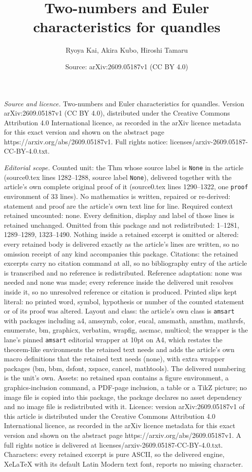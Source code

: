\documentclass[10pt,a4paper]{amsart}
\title[Two-numbers and Euler characteristics for quandles]{Two-numbers and Euler characteristics for quandles}
\author{Ryoya Kai, Akira Kubo, Hiroshi Tamaru}
\date{Source: arXiv:2609.05187v1 (CC BY 4.0)}
\begin{document}
\maketitle

\noindent\emph{Source and licence.} Two-numbers and Euler characteristics for quandles. Version arXiv:2609.05187v1 (CC BY 4.0), distributed under the Creative Commons Attribution 4.0 International licence, as recorded in the arXiv licence metadata for this exact version and shown on the abstract page https://arxiv.org/abs/2609.05187v1. Full rights notice: licenses/arxiv-2609.05187-CC-BY-4.0.txt.\par\smallskip

\noindent\textit{Editorial scope.} Counted unit: the Thm whose source label is \texttt{None} in the article (source0.tex lines 1282--1288, source label \texttt{None}), delivered together with the article's own complete original proof of it (source0.tex lines 1290--1322, one \texttt{proof} environment of 33 lines). No mathematics is written, repaired or re-derived: statement and proof are the article's own text line for line. Required context retained uncounted: none. Every definition, display and label of those lines is retained unchanged. Omitted from this package and not redistributed: 1--1281, 1289--1289, 1323--1490. Nothing inside a retained excerpt is omitted or altered: every retained body is delivered exactly as the article's lines are written, so no omission receipt of any kind accompanies this package. Citations: the retained excerpts carry no citation command at all, so no bibliography entry of the article is transcribed and no reference is redistributed. Reference adaptation: none was needed and none was made; every reference inside the delivered unit resolves inside it, so no unresolved reference or citation is produced. Printed slips kept literal: no printed word, symbol, hypothesis or number of the counted statement or of its proof was altered. Layout and class: the article's own class is \texttt{amsart} with packages including a4, amssymb, color, eucal, amsmath, amsthm, mathrsfs, enumerate, bm, graphicx, verbatim, wrapfig, ascmac, multicol; the wrapper is the lane's pinned \texttt{amsart} editorial wrapper at 10pt on A4, which restates the theorem-like environments the retained text needs and adds the article's own macro definitions that the retained text needs (none), with extra wrapper packages (bm, bbm, dsfont, xspace, cancel, mathtools). The delivered numbering is the unit's own. Assets: no retained span contains a figure environment, a graphics-inclusion command, a PDF-page inclusion, a table or a TikZ picture; no image file is copied into this package, the package declares no asset dependency and no image file is redistributed with it. Licence: version arXiv:2609.05187v1 of this article is distributed under the Creative Commons Attribution 4.0 International licence, as recorded in the arXiv licence metadata for this exact version and shown on the abstract page https://arxiv.org/abs/2609.05187v1. A full rights notice is delivered at licenses/arxiv-2609.05187-CC-BY-4.0.txt. Characters: every retained excerpt is pure ASCII, so the delivered engine, XeLaTeX with its default Latin Modern text font, reports no missing character.
\end{document}
